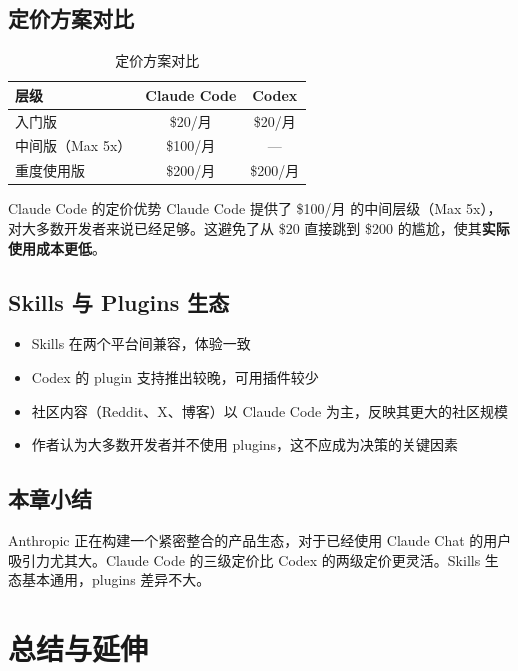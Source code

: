 \documentclass[a4paper]{article}
\begin{document}
\subsection{定价方案对比}

\begin{table}[H]
\centering
\caption{定价方案对比}
\begin{tabular}{lcc}
\toprule
\textbf{层级} & \textbf{Claude Code} & \textbf{Codex} \\
\midrule
入门版 & \$20/月 & \$20/月 \\
中间版（Max 5x） & \$100/月 & --- \\
重度使用版 & \$200/月 & \$200/月 \\
\bottomrule
\end{tabular}
\end{table}

\begin{importantbox}{Claude Code 的定价优势}
Claude Code 提供了 \$100/月 的中间层级（Max 5x），对大多数开发者来说已经足够。这避免了从 \$20 直接跳到 \$200 的尴尬，使其\textbf{实际使用成本更低}。
\end{importantbox}

\subsection{Skills 与 Plugins 生态}

\begin{itemize}
    \item Skills 在两个平台间兼容，体验一致
    \item Codex 的 plugin 支持推出较晚，可用插件较少
    \item 社区内容（Reddit、X、博客）以 Claude Code 为主，反映其更大的社区规模
    \item 作者认为大多数开发者并不使用 plugins，这不应成为决策的关键因素
\end{itemize}

\subsection{本章小结}

Anthropic 正在构建一个紧密整合的产品生态，对于已经使用 Claude Chat 的用户吸引力尤其大。Claude Code 的三级定价比 Codex 的两级定价更灵活。Skills 生态基本通用，plugins 差异不大。

\section{总结与延伸}
\end{document}

